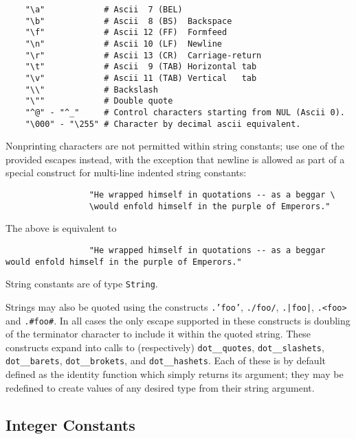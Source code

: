 \begin{verbatim}
    "\a"            # Ascii  7 (BEL)
    "\b"            # Ascii  8 (BS)  Backspace
    "\f"            # Ascii 12 (FF)  Formfeed
    "\n"            # Ascii 10 (LF)  Newline
    "\r"            # Ascii 13 (CR)  Carriage-return
    "\t"            # Ascii  9 (TAB) Horizontal tab
    "\v"            # Ascii 11 (TAB) Vertical   tab
    "\\"            # Backslash
    "\""            # Double quote
    "^@" - "^_"     # Control characters starting from NUL (Ascii 0).
    "\000" - "\255" # Character by decimal ascii equivalent.
\end{verbatim}

Nonprinting characters are not permitted within string constants; 
use one of the provided escapes instead, with the exception that 
newline is allowed as part of a special construct for multi-line 
indented string constants:

\begin{verbatim}
                 "He wrapped himself in quotations -- as a beggar \
                 \would enfold himself in the purple of Emperors."
\end{verbatim}

The above is equivalent to

\begin{verbatim}
                 "He wrapped himself in quotations -- as a beggar would enfold himself in the purple of Emperors."
\end{verbatim}

String constants are of type {\tt String}.

Strings may also be quoted using the constructs {\tt .'foo'},  {\tt ./foo/}, {\tt .|foo|}, {\tt .<foo>} 
and {\tt .#foo#}.  In all cases the only escape supported in these constructs is doubling 
of the terminator character to include it within the quoted string.  These constructs 
expand into calls to (respectively) {\tt dot\_\_quotes}, {\tt dot\_\_slashets}, {\tt dot\_\_barets}, {\tt dot\_\_brokets}, 
and {\tt dot\_\_hashets}.  Each of these is by default defined as the identity function which 
simply returns its argument;  they may be redefined to create values of any desired type from 
their string argument.

\cutend*

\subsection{Integer Constants}
\label{section:ref:constants:integer}


